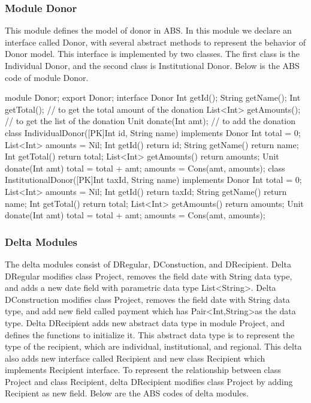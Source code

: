 \documentclass[runningheads,a4paper]{llncs}
\begin{document}
\subsubsection{Module Donor}
This module defines the model of donor in ABS. In this module we declare an interface called Donor, with several abstract methods to represent the behavior of Donor model. This interface is implemented by two classes. The first class is the Individual Donor, and the second class is Institutional Donor. Below is the ABS code of module Donor.

\begin{abscode}
	module Donor;
	export Donor;
	interface Donor {
		Int getId();
		String getName();
		Int getTotal();				// to get the total amount of the donation
		List<Int> getAmounts();		// to get the list of the donation
		Unit donate(Int amt);		// to add the donation
	}
	class IndividualDonor([PK]Int id, String name) implements Donor { 
		Int total = 0;
		List<Int> amounts = Nil;
		Int getId() { return id; }
		String getName() { return name; }
		Int getTotal() { return total;}
		List<Int> getAmounts() { return amounts; }
		Unit donate(Int amt) {	
			total = total + amt;
			amounts = Cons(amt, amounts);
		}
	}
	class InstitutionalDonor([PK]Int taxId, String name) implements Donor { 
		Int total = 0;
		List<Int> amounts = Nil;
		Int getId() { return taxId; }
		String getName() { return name; }
		Int getTotal() { return total;}
		List<Int> getAmounts() { return amounts; }
		Unit donate(Int amt) {	
			total = total + amt;
			amounts = Cons(amt, amounts);
		}
	}
\end{abscode}

\subsubsection{Delta Modules}
The delta modules consist of DRegular, DConstuction, and DRecipient. Delta DRegular modifies class Project, removes the field date with String data type, and adds a new date field with parametric data type List\textless String\textgreater. Delta DConstruction modifies class Project, removes the field date with String data type, and add new field called payment which has Pair\textless Int,String\textgreater as the data type. Delta DRecipient adds new abstract data type in module Project, and defines the functions to initialize it. This abstract data type is to represent the type of the recipient, which are individual, institutional, and regional. This delta also adds new interface called Recipient and new class Recipient which implements Recipient interface. To represent the relationship between class Project and class Recipient, delta DRecipient modifies class Project by adding Recipient as new field. Below are the ABS codes of delta modules.
\end{document}
